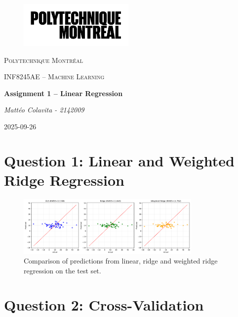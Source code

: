 \documentclass[11pt, a4paper]{report}
\begin{document}
\begin{titlepage}
    \centering
    \begin{figure}[h]
        \centering
        \includegraphics[width=0.5\textwidth]{./assets/logo_polymtl.png}
        \label{fig:logo_polymtl}
    \end{figure}

    {\scshape\LARGE Polytechnique Montréal \par}
    \vspace{1cm}
    {\scshape\Large INF8245AE – Machine Learning \par}
    \vspace{4cm}
    {\huge\bfseries Assignment 1 – Linear Regression\par}
    \vspace{2cm}
    {\Large\itshape Mattéo Colavita - 2142009\par}
    \vfill
    \vspace{0.8cm}
    {\large 2025-09-26\par}
\end{titlepage}

\section{Question 1: Linear and Weighted Ridge Regression}

\begin{figure}[h!]
\centering
\includegraphics[width=0.8\textwidth]{./assets/regression_comparison.png}
\caption{Comparison of predictions from linear, ridge and weighted ridge regression on the test set.}
\label{fig:linear_vs_weighted_ridge}
\end{figure}

\section{Question 2: Cross-Validation}
\end{document}
